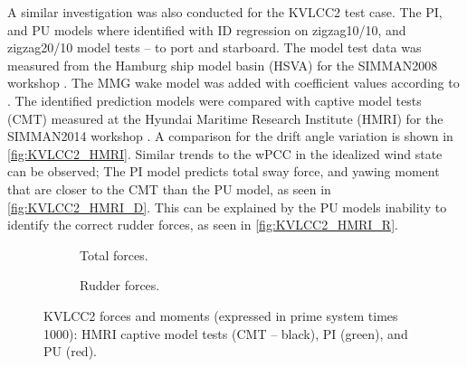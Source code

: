 A similar investigation was also conducted for the KVLCC2 test case. The PI, and PU models where identified with ID regression on zigzag10/10, and zigzag20/10 model tests -- to port and starboard. The model test data was measured from the Hamburg ship model basin (HSVA) for the SIMMAN2008 workshop \citep{stern_experience_2011}.
The MMG wake model was added with coefficient values according to \citet{yasukawa_introduction_2015}.
The identified prediction models were compared with captive model tests (CMT) measured at the Hyundai Maritime Research Institute (HMRI) for the SIMMAN2014 workshop \citep{ittc_final_2017}. A comparison for the drift angle variation is shown in \autoref{fig:KVLCC2_HMRI}. 
Similar trends to the wPCC in the idealized wind state can be observed; The PI model predicts total sway force, and yawing moment that are closer to the CMT than the PU model, as seen in \autoref{fig:KVLCC2_HMRI_D}.
This can be explained by the PU models inability to identify the correct rudder forces, as seen in \autoref{fig:KVLCC2_HMRI_R}.
%
\begin{figure}
    \centering
    \begin{subfigure}[b]{0.49\textwidth}
        \centering
        
        \caption{Total forces.}
        \label{fig:KVLCC2_HMRI_D}
    \end{subfigure}
    \hfill
    \begin{subfigure}[b]{0.49\textwidth}
        \centering
        
        \caption{Rudder forces.}
        \label{fig:KVLCC2_HMRI_R}
    \end{subfigure}
    \caption{KVLCC2 forces and moments (expressed in prime system times 1000): HMRI captive model tests (CMT -- black), PI (green), and PU (red).}
    \label{fig:KVLCC2_HMRI}
\end{figure}